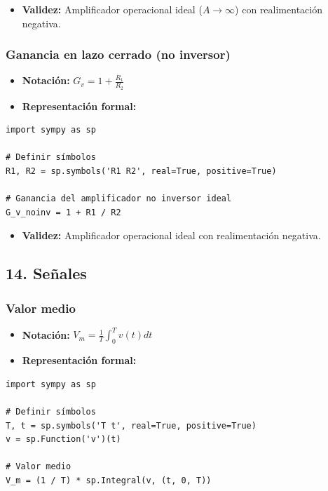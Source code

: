 \documentclass[11pt,a4paper]{article}
\begin{document}
\begin{itemize}[leftmargin=*,topsep=2pt,itemsep=1pt]
  \item \textbf{Validez:} Amplificador operacional ideal ($A \to \infty$) con realimentación negativa.
\end{itemize}


\subsubsection*{Ganancia en lazo cerrado (no inversor)}


\begin{itemize}[leftmargin=*,topsep=2pt,itemsep=1pt]
  \item \textbf{Notación:} $G_v = 1 + \frac{R_1}{R_2}$
  \item \textbf{Representación formal:}
\end{itemize}


\begin{lstlisting}
import sympy as sp

# Definir símbolos
R1, R2 = sp.symbols('R1 R2', real=True, positive=True)

# Ganancia del amplificador no inversor ideal
G_v_noinv = 1 + R1 / R2
\end{lstlisting}


\begin{itemize}[leftmargin=*,topsep=2pt,itemsep=1pt]
  \item \textbf{Validez:} Amplificador operacional ideal con realimentación negativa.
\end{itemize}


\subsection*{14. Señales}


\subsubsection*{Valor medio}


\begin{itemize}[leftmargin=*,topsep=2pt,itemsep=1pt]
  \item \textbf{Notación:} $V_m = \frac{1}{T} \int_0^T v(t) dt$
  \item \textbf{Representación formal:}
\end{itemize}


\begin{lstlisting}
import sympy as sp

# Definir símbolos
T, t = sp.symbols('T t', real=True, positive=True)
v = sp.Function('v')(t)

# Valor medio
V_m = (1 / T) * sp.Integral(v, (t, 0, T))
\end{lstlisting}
\end{document}
